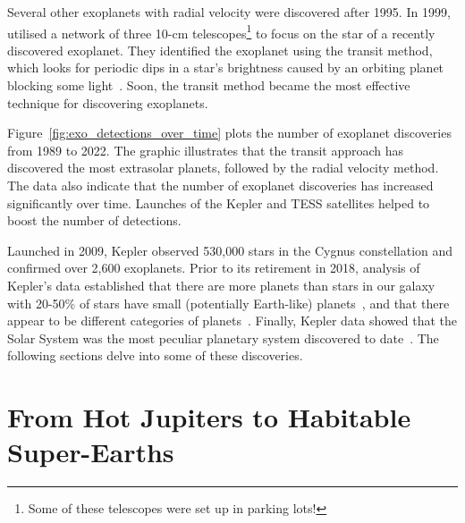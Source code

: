 Several other exoplanets with radial velocity were discovered after 1995.
In 1999, \citet{charbonneau1999detection} utilised a network of three 10-cm telescopes\footnote{Some of these telescopes were set up in parking lots!} to focus on the star of a recently discovered exoplanet.
They identified the exoplanet using the transit method, which looks for periodic dips in a star's brightness caused by an orbiting planet blocking some light~\cite{charbonneau1999detection}.
Soon, the transit method became the most effective technique for discovering exoplanets.

Figure~\ref{fig:exo_detections_over_time} plots the number of exoplanet discoveries from 1989 to 2022. 
The graphic illustrates that the transit approach has discovered the most extrasolar planets, followed by the radial velocity method.
The data also indicate that the number of exoplanet discoveries has increased significantly over time.
Launches of the Kepler and TESS satellites helped to boost the number of detections.

Launched in 2009, Kepler observed 530,000 stars in the Cygnus constellation and confirmed over 2,600 exoplanets. 
Prior to its retirement in 2018, analysis of Kepler's data established that there are more planets than stars in our galaxy~\cite{Swift_2013} with 20-50\% of stars have small (potentially Earth-like) planets~\cite{Fressin:2012:Natur, Petigura:2013:PNAS}, and that there appear to be different categories of planets~\cite{Traub:2012:ApJ, Morris:2017:ApJ, Yu:2017:ApJ}.
Finally, Kepler data showed that the Solar System was the most peculiar planetary system discovered to date~\cite{Weiss:2018:AJ}. 
The following sections delve into some of these discoveries.





\section{From Hot Jupiters to Habitable Super-Earths}


